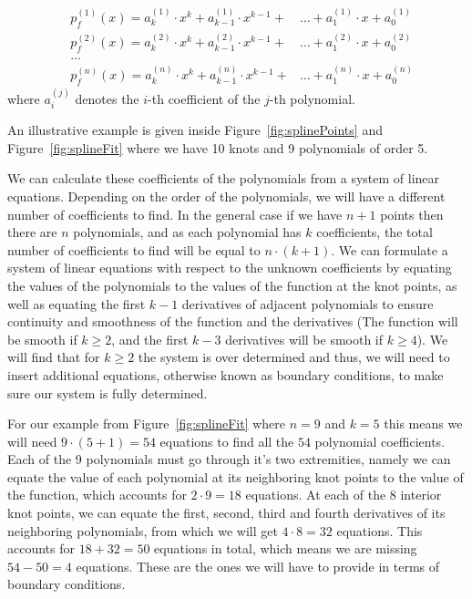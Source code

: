 \documentclass[12pt, a4paper]{article}
\begin{document}
\begin{equation} \label{eq:piecewisePolynomial}
    \begin{aligned}
    &p_f^{(1)}(x) = a_k^{(1)} \cdot x^k + a_{k-1}^{(1)} \cdot x^{k-1} + &\ldots + a_1^{(1)} \cdot x + a_0^{(1)} \\ 
    &p_f^{(2)}(x) = a_k^{(2)} \cdot x^k + a_{k-1}^{(2)} \cdot x^{k-1} + &\ldots + a_1^{(2)} \cdot x + a_0^{(2)} \\
    &\ldots                                                                                                  \\
    &p_f^{(n)}(x) = a_k^{(n)} \cdot x^k + a_{k-1}^{(n)} \cdot x^{k-1} + &\ldots + a_1^{(n)} \cdot x + a_0^{(n)}
    \end{aligned}
\end{equation}
where \( a_i^{(j)}\) denotes the \(i\)-th coefficient of the \(j\)-th polynomial.\par
An illustrative example is given inside Figure~\ref{fig:splinePoints} and Figure~\ref{fig:splineFit} where we have 10 knots and 9 polynomials of order 5.\par
We can calculate these coefficients of the polynomials from a system of linear equations. Depending on the order of the polynomials, we will have a different number of coefficients to find. In the general case if we have \( n+1 \) points then there are \( n \) polynomials, and as each polynomial has \(k \) coefficients, the total number of coefficients to find will be equal to \( n \cdot (k+1) \). We can formulate a system of linear equations with respect to the unknown coefficients by equating the values of the polynomials to the values of the function at the knot points, as well as equating the first \(k-1\) derivatives of adjacent polynomials to ensure continuity and smoothness of the function and the derivatives (The function will be smooth if \( k \geq 2\), and the first \(k-3\) derivatives will be smooth if \( k \geq 4 \)). We will find that for $k \geq 2$ the system is over determined and thus, we will need to insert additional equations, otherwise known as boundary conditions, to make sure our system is fully determined.\par
For our example from Figure~\ref{fig:splineFit} where \( n=9\) and \(k=5\) this means we will need \( 9\cdot (5+1) = 54 \) equations to find all the \( 54 \) polynomial coefficients. Each of the 9 polynomials must go through it's two extremities, namely we can equate the value of each polynomial at its neighboring knot points to the value of the function, which accounts for \( 2 \cdot 9 = 18 \) equations. At each of the 8 interior knot points, we can equate the first, second, third and fourth derivatives of its neighboring polynomials, from which we will get \( 4 \cdot 8 = 32 \) equations. This accounts for \( 18 + 32 = 50 \) equations in total, which means we are missing \( 54 - 50 = 4 \) equations. These are the ones we will have to provide in terms of boundary conditions.\par
\end{document}
